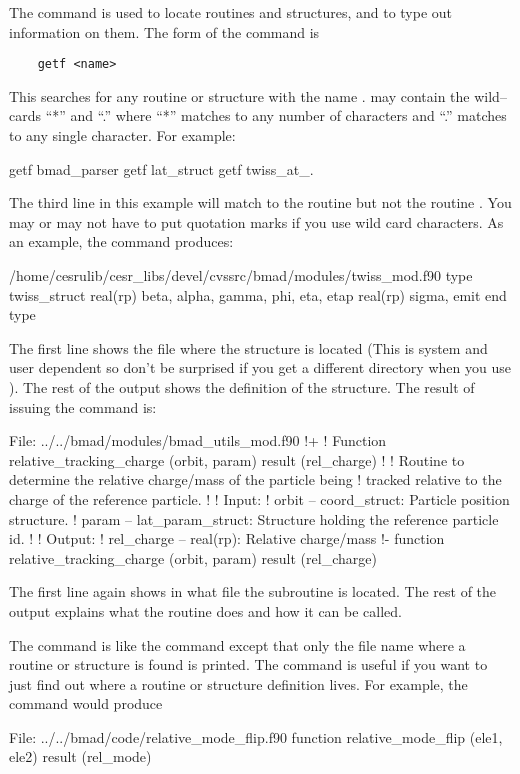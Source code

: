 {{{{{{The  command is used to locate routines and structures, and
to type out information on them.  The form of the command is
\begin{verbatim}
    getf <name>
\end{verbatim}
This searches for any routine or structure with the name
.  may contain the wild--cards ``*'' and ``.'' where
``*'' matches to any number of characters and ``.'' matches to any
single character. For example:
\begin{example}
    getf bmad_parser
    getf lat_struct
    getf twiss_at_.
\end{example}
The third line in this example will match to the routine
 but not the routine . You may or
may not have to put quotation marks if you use wild card characters.
As an example, the command  produces:
\begin{example}
  /home/cesrulib/cesr_libs/devel/cvssrc/bmad/modules/twiss_mod.f90
    type twiss_struct
      real(rp) beta, alpha, gamma, phi, eta, etap
      real(rp) sigma, emit
    end type
\end{example}
The first line shows the file where the structure is located (This is
system and user dependent so don't be surprised if you get a different
directory when you use ). The rest of the output shows the
definition of the  structure.  The result of issuing
the command  is:
\begin{example}
  File: ../../bmad/modules/bmad_utils_mod.f90
  !+
  ! Function relative_tracking_charge (orbit, param) result (rel_charge)
  !
  ! Routine to determine the relative charge/mass of the particle being
  ! tracked relative to the charge of the reference particle.
  !
  ! Input:
  !   orbit -- coord_struct: Particle position structure.
  !   param -- lat_param_struct: Structure holding the reference particle id.
  !
  ! Output:
  !   rel_charge -- real(rp): Relative charge/mass
  !-
  function relative_tracking_charge (orbit, param) result (rel_charge)
\end{example}
The first line again shows in what file the subroutine is located.
The rest of the output explains what the routine does and how it
can be called.

The  command is like the  command except that only
the file name where a routine or structure is found is printed.
The  command is useful if you
want to just find out where a routine or structure definition lives.
For example, the  command would produce
\begin{example}
  File: ../../bmad/code/relative_mode_flip.f90
      function relative_mode_flip (ele1, ele2) result (rel_mode)


\end{example}}}}}}}
